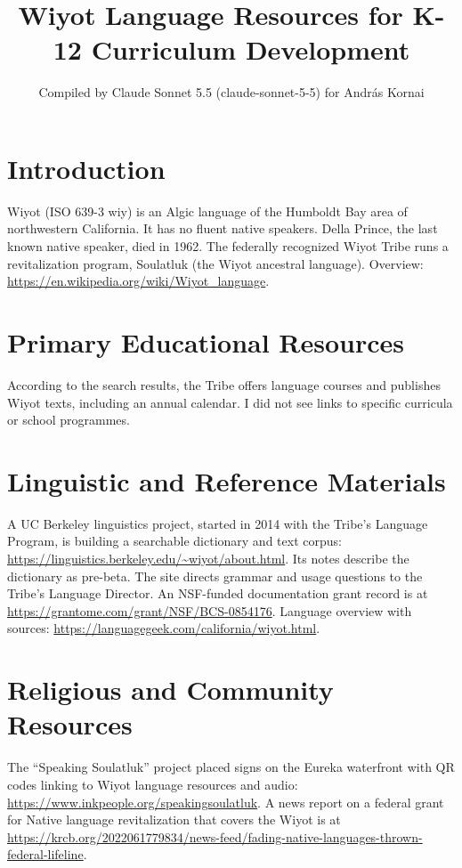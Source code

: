 \documentclass[12pt]{article}
\title{Wiyot Language Resources for K-12 Curriculum Development}
\author{Compiled by Claude Sonnet 5.5 (claude-sonnet-5-5) for Andr\'as Kornai}
\date{}
\begin{document}
\maketitle

\section{Introduction}
Wiyot (ISO 639-3 wiy) is an Algic language of the Humboldt Bay area of northwestern California. It has no fluent native speakers. Della Prince, the last known native speaker, died in 1962. The federally recognized Wiyot Tribe runs a revitalization program, Soulatluk (the Wiyot ancestral language). Overview: \url{https://en.wikipedia.org/wiki/Wiyot_language}.

\section{Primary Educational Resources}
According to the search results, the Tribe offers language courses and publishes Wiyot texts, including an annual calendar. I did not see links to specific curricula or school programmes.

\section{Linguistic and Reference Materials}
A UC Berkeley linguistics project, started in 2014 with the Tribe's Language Program, is building a searchable dictionary and text corpus: \url{https://linguistics.berkeley.edu/~wiyot/about.html}. Its notes describe the dictionary as pre-beta. The site directs grammar and usage questions to the Tribe's Language Director. An NSF-funded documentation grant record is at \url{https://grantome.com/grant/NSF/BCS-0854176}. Language overview with sources: \url{https://languagegeek.com/california/wiyot.html}.

\section{Religious and Community Resources}
The ``Speaking Soulatluk'' project placed signs on the Eureka waterfront with QR codes linking to Wiyot language resources and audio: \url{https://www.inkpeople.org/speakingsoulatluk}. A news report on a federal grant for Native language revitalization that covers the Wiyot is at \url{https://krcb.org/2022061779834/news-feed/fading-native-languages-thrown-federal-lifeline}.
\end{document}
